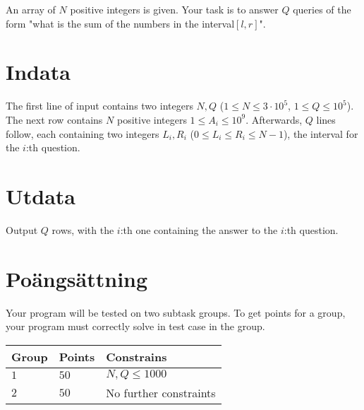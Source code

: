 An array of $N$ positive integers is given. Your task is to answer $Q$ queries
of the form "what is the sum of the numbers in the interval$[l,r]$".

\section*{Indata}
The first line of input contains two integers $N, Q$ ($1 \leq N \leq 3 \cdot 10^5$, $1 \leq Q \leq 10^5$).
The next row contains $N$ positive integers $1 \leq A_i \leq 10^9$.
Afterwards, $Q$ lines follow, each containing two integers $L_{i},R_{i}$ ($0 \leq L_{i} \leq R_{i} \leq N-1$), the
interval for the $i$:th question.

\section*{Utdata}
Output $Q$ rows, with the $i$:th one containing the answer to the $i$:th question.

\section*{Poängsättning}
Your program will be tested on two subtask groups.
\noindent
To get points for a group, your program must correctly solve in test case in the group.

\noindent
\begin{tabular}{| l | l | l |}
\hline
  Group & Points & Constrains \\ \hline
  $1$    & $50$       &  $N,Q \leq 1000$ \\ \hline
  $2$    & $50$       &  No further constraints \\ \hline
\end{tabular}
